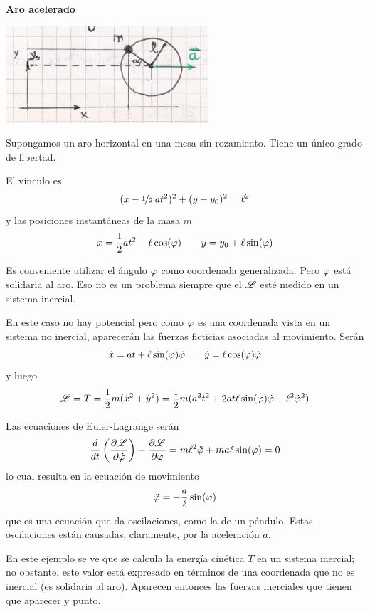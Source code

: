 \documentclass[10pt,oneside]{CBFT_book}
\begin{document}
\begin{ejemplo}{\bfseries Aro acelerado }

\includegraphics[scale=0.35]{images/fig_mc_aro_acelerado_lag.jpg}

Supongamos un aro horizontal en una mesa sin rozamiento. Tiene un único grado de libertad.

El vínculo es
\[
	(x - \nicefrac{1}{2} \: at^2)^2 + (y-y_0 )^2 = \ell^2
\]
y las posiciones instantáneas de la masa $ m $
\[
	x = \frac{1}{2}at^2 - \ell \cos(\varphi) \qquad  y = y_0 + \ell \sin(\varphi)
\]

Es conveniente utilizar el ángulo $\varphi$ como coordenada generalizada. Pero $\varphi$ está solidaria al aro.
Eso no es un problema siempre que el $\mathscr{L}$ esté medido en un sistema inercial.

En este caso no hay potencial pero como $\varphi$ es una coordenada vista en un sistema no inercial, aparecerán
las fuerzas ficticias asociadas al movimiento.
Serán
\[
	\dot{x} = at + \ell \sin(\varphi) \dot{\varphi} \qquad \dot{y} = \ell \cos(\varphi) \dot{\varphi}
\]
y luego 
\[
	\mathscr{L} = T = \frac{1}{2} m (\dot{x}^2 + \dot{y}^2 ) = \frac{1}{2} m
	(a^2 t^2 + 2at\ell\sin(\varphi)\dot{\varphi}+\ell^2\dot{\varphi}^2)
\]

Las ecuaciones de Euler-Lagrange serán 
\[
	\frac{d^{\hspace{-0.05em}} {}}{d {t}^{\hspace{-0.05em}}}\left( \frac{\partial^{\hspace{-0.05em}} {\mathscr{L}}}{\partial {\dot{\varphi}}^{\hspace{-0.05em}}}\right) - \frac{\partial^{\hspace{-0.05em}} {\mathscr{L}}}{\partial {\varphi}^{\hspace{-0.05em}}} = 
	m \ell^2 \ddot{\varphi} + ma\ell \sin(\varphi) = 0
\]
lo cual resulta en la ecuación de movimiento
\[
	\ddot{\varphi} = - \frac{a}{\ell} \sin(\varphi) 
\]
que es una ecuación que da oscilaciones, como la de un péndulo. Estas oscilaciones están causadas, claramente,
por la aceleración $a$.

En este ejemplo se ve que se calcula la energía cinética $T$ en un sistema inercial; no obstante, este valor está
expresado en términos de una coordenada que no es inercial (es solidaria al aro). Aparecen entonces las fuerzas 
inerciales que tienen que aparecer y punto.



\end{ejemplo}
\end{document}
